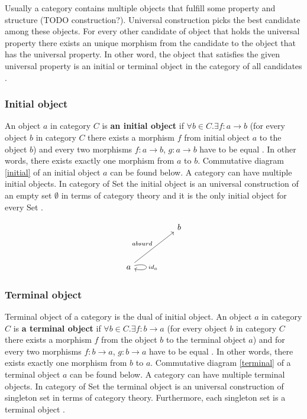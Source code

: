\documentclass[article]{aaltoseries}
\begin{document}
    Usually a category contains multiple objects that fulfill some property and
    structure (TODO construction?). Universal construction picks the best candidate among
    these objects. For every other candidate of object that holds the universal
    property there exists an unique morphism from the candidate to the object that
    has the universal property. In other word, the object that satisfies the given
    universal property is an initial or terminal object in the category of all
    candidates \cite{pierce1991basic}.
  

  \subsubsection{Initial object}
    An object $a$ in category $C$ is \textbf{an initial object} if $\forall b \in
    C. \exists f: a \rightarrow b$ (for every object $b$ in category $C$ there
    exists a morphism $f$ from initial object $a$ to the object $b$) and every
    two morphisms $f: a \rightarrow b$, $g: a \rightarrow b$ have to be
    equal \cite{barr1990category, pierce1991basic}. In other words, there exists
    exactly one morphism from $a$ to $b$. Commutative diagram \ref{initial} of an initial
    object $a$ can be found below. A category can have multiple initial
    objects. In category of Set the initial object is an universal construction
    of an empty set $\emptyset$ in terms of category theory and it is the only initial
    object for every Set \cite{barr1990category, pierce1991basic}.

    \begin{equation}
      \label{initial}
      \begin{tikzcd}[row sep=huge, column sep=huge]
        & b \\
        a \arrow[ur, "absurd"]
        \arrow[loop right, distance=2em, "id_{a}"]
        & 
      \end{tikzcd}
    \end{equation}


  \subsubsection{Terminal object}
    Terminal object of a category is the dual of initial object. An object $a$
    in category $C$ is \textbf{a terminal object} if $\forall b \in C. \exists
    f: b \rightarrow a$ (for every object $b$ in category $C$ there exists a
    morphism $f$ from the object $b$ to the terminal object $a$) and for every
    two morphisms $f: b \rightarrow a$, $g: b \rightarrow a$ have to be equal
    \cite{barr1990category, pierce1991basic}. In other words, there exists
    exactly one morphism from $b$ to $a$. Commutative diagram \ref{terminal} of
    a terminal object $a$ can be found below. A category can have multiple terminal
    objects. In category of Set the terminal object is an universal construction
    of singleton set in terms of category theory. Furthermore, each singleton
    set is a terminal object \cite{barr1990category, pierce1991basic}.
\end{document}
